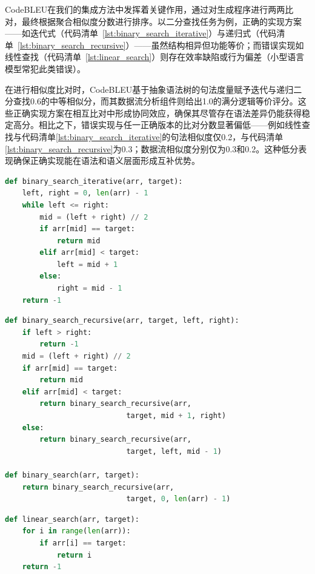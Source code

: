 \documentclass{article}
\begin{document}
CodeBLEU在我们的集成方法中发挥着关键作用，通过对生成程序进行两两比对，最终根据聚合相似度分数进行排序。以二分查找任务为例，正确的实现方案——如迭代式（代码清单~\ref{lst:binary_search_iterative}）与递归式（代码清单~\ref{lst:binary_search_recursive}）——虽然结构相异但功能等价；而错误实现如线性查找（代码清单~\ref{lst:linear_search}）则存在效率缺陷或行为偏差（小型语言模型常犯此类错误）。

在进行相似度比对时，CodeBLEU基于抽象语法树的句法度量赋予迭代与递归二分查找0.6的中等相似分，而其数据流分析组件则给出1.0的满分逻辑等价评分。这些正确实现方案在相互比对中形成协同效应，确保其尽管存在语法差异仍能获得稳定高分。相比之下，错误实现与任一正确版本的比对分数显著偏低——例如线性查找与代码清单\ref{lst:binary_search_iterative}的句法相似度仅0.2，与代码清单\ref{lst:binary_search_recursive}为0.3；数据流相似度分别仅为0.3和0.2。这种低分表现确保正确实现能在语法和语义层面形成互补优势。

\begin{lstlisting}[language=Python, caption={Iterative Binary Search Implementation}, label={lst:binary_search_iterative}]
def binary_search_iterative(arr, target):
    left, right = 0, len(arr) - 1
    while left <= right:
        mid = (left + right) // 2
        if arr[mid] == target:
            return mid
        elif arr[mid] < target:
            left = mid + 1
        else:
            right = mid - 1
    return -1
\end{lstlisting}

\begin{lstlisting}[language=Python, caption={Recursive Binary Search Implementation}, label={lst:binary_search_recursive}]
def binary_search_recursive(arr, target, left, right):
    if left > right:
        return -1
    mid = (left + right) // 2
    if arr[mid] == target:
        return mid
    elif arr[mid] < target:
        return binary_search_recursive(arr,
                            target, mid + 1, right)
    else:
        return binary_search_recursive(arr,
                            target, left, mid - 1)

def binary_search(arr, target):
    return binary_search_recursive(arr,
                            target, 0, len(arr) - 1)
\end{lstlisting}

\begin{lstlisting}[language=Python, caption={Linear Search Implementation (Incorrect, as the task requires a Binary Search algorithm)}, label={lst:linear_search}]
def linear_search(arr, target):
    for i in range(len(arr)):
        if arr[i] == target:
            return i
    return -1
\end{lstlisting}
\end{document}
